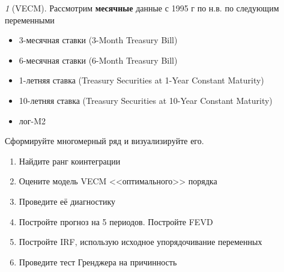 \documentclass[12pt]{article}
\theoremstyle{remark}
\newtheorem{exercise}{}[subsection]
\begin{document}
\begin{exercise}[VECM]
Рассмотрим \textbf{месячные} данные с 1995 г по н.в. по следующим переменными
\begin{itemize}
	\item 3-месячная ставки (3-Month Treasury Bill)
	\item 6-месячная ставки (6-Month Treasury Bill)
	\item 1-летняя ставка (Treasury Securities at 1-Year Constant Maturity)
	\item 10-летняя ставка (Treasury Securities at 10-Year Constant Maturity)
	\item лог-M2
\end{itemize}
Сформируйте многомерный ряд и визуализируйте его.
\begin{enumerate}
	\item Найдите ранг коинтеграции
	\item Оцените модель VECM <<оптимального>> порядка
	\item Проведите её диагностику
	\item Постройте прогноз на 5 периодов. Постройте FEVD
	\item Постройте IRF, использую исходное упорядочивание переменных
	\item Проведите тест Гренджера на причинность
\end{enumerate}
\end{exercise}

\end{document}
